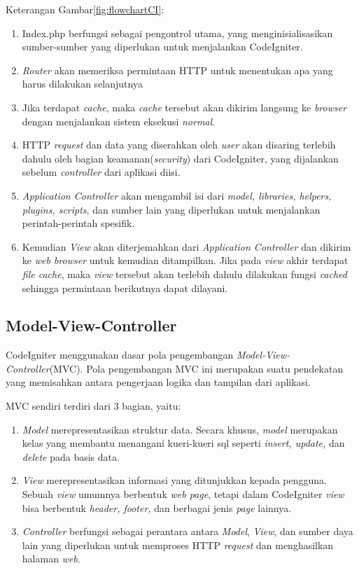 Keterangan Gambar\ref{fig:flowchartCI}:
\begin{enumerate}
	\item Index.php berfungsi sebagai pengontrol utama, yang menginisialisasikan sumber-sumber yang diperlukan untuk menjalankan CodeIgniter.
	\item \textit{Router} akan memeriksa permintaan HTTP untuk menentukan apa yang harus dilakukan selanjutnya
	\item Jika terdapat \textit{cache}, maka \textit{cache} tersebut akan dikirim langsung ke \textit{browser} dengan menjalankan sistem eksekusi \textit{normal}.
	\item  HTTP \textit{request} dan data yang diserahkan oleh \textit{user} akan disaring terlebih dahulu oleh bagian keamanan(\textit{security}) dari CodeIgniter, yang dijalankan sebelum \textit{controller} dari aplikasi diisi.
	\item \textit{Application Controller} akan mengambil isi dari \textit{model, libraries, helpers, plugins, scripts}, dan sumber lain yang diperlukan untuk menjalankan perintah-perintah spesifik.
	\item Kemudian \textit{View} akan diterjemahkan dari \textit{Application Controller} dan dikirim ke \textit{web browser} untuk kemudian ditampilkan. Jika pada \textit{view} akhir terdapat \textit{file cache}, maka \textit{view} tersebut akan terlebih dahulu dilakukan fungsi \textit{cached} sehingga permintaan berikutnya dapat dilayani.
\end{enumerate}

\subsection{Model-View-Controller}
\label{sub: MVC}

CodeIgniter menggunakan dasar pola pengembangan \textit{Model-View-Controller}(MVC). Pola pengembangan MVC ini merupakan suatu pendekatan yang memisahkan antara pengerjaan logika dan tampilan dari aplikasi.

MVC sendiri terdiri dari 3 bagian, yaitu:
\begin{enumerate}
	\item \textit{Model} merepresentasikan struktur data. Secara khusus, \textit{model} merupakan kelas yang membantu menangani kueri-kueri sql seperti \textit{insert, update,} dan \textit{delete} pada basis data.
	\item \textit{View} merepresentasikan informasi yang ditunjukkan kepada pengguna. Sebuah \textit{view} umumnya berbentuk \textit{web page}, tetapi dalam CodeIgniter \textit{view} bisa berbentuk \textit{header, footer,} dan berbagai jenis \textit{page} lainnya.
	\item \textit{Controller} berfungsi sebagai perantara antara \textit{Model}, \textit{View}, dan sumber daya lain yang diperlukan untuk memproses HTTP \textit{request} dan menghasilkan halaman \textit{web}.
\end{enumerate}

